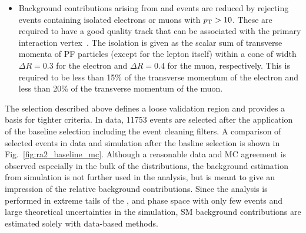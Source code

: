 \begin{itemize}
 \item{Background contributions arising from \ttbar and \WJets events are reduced by rejecting events containing isolated electrons or muons with $p_{\text{T}} > 10$\gev. These are required to have a good quality track that can be associated with the primary interaction vertex~\cite{CMS-PAS-EGM-10-004, CMS-PAS-MUO-10-002}. The isolation is given as the scalar sum of transverse momenta of PF particles (except for the lepton itself) within a cone of width $\Delta R = 0.3$ for the electron and $\Delta R = 0.4$ for the muon, respectively. This is required to be less than 15\% of the transverse momentum of the electron and less than 20\% of the transverse momentum of the muon.}
\end{itemize}
The selection described above defines a loose validation region and provides a basis for tighter criteria. In data, 11753 events are selected after the application of the baseline selection including the event cleaning filters. A comparison of selected events in data and simulation after the basline selection is shown in Fig.~\ref{fig:ra2_baseline_mc}. Although a reasonable data and MC agreement is observed especially in the bulk of the distributions, the background estimation from simulation is not further used in the analysis, but is meant to give an impression of the relative background contributions. Since the analysis is performed in extreme tails of the \HT, \MHT and \NJets phase space with only few events and large theoretical uncertainties in the simulation, SM background contributions are estimated solely with data-based methods.

